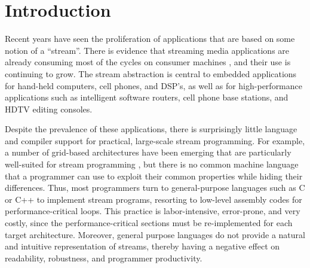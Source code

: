 \section{Introduction}

Recent years have seen the proliferation of applications that are
based on some notion of a ``stream''.  There is evidence that
streaming media applications are already consuming most of the cycles
on consumer machines \cite{Rix98}, and their use is continuing to
grow.  The stream abstraction is central to embedded applications for
hand-held computers, cell phones, and DSP's, as well as for
high-performance applications such as intelligent software routers,
cell phone base stations, and HDTV editing consoles.

Despite the prevalence of these applications, there is surprisingly
little language and compiler support for practical, large-scale stream
programming.  For example, a number of grid-based architectures have
been emerging that are particularly well-suited for stream programming
\cite{raw, smart memories, keckler}, but there is no common machine
language that a programmer can use to exploit their common properties
while hiding their differences.  Thus, most programmers turn to
general-purpose languages such as C or C++ to implement stream
programs, resorting to low-level assembly codes for
performance-critical loops.  This practice is labor-intensive,
error-prone, and very costly, since the performance-critical sections
must be re-implemented for each target architecture.  Moreover,
general purpose languages do not provide a natural and intuitive
representation of streams, thereby having a negative effect on
readability, robustness, and programmer productivity.

